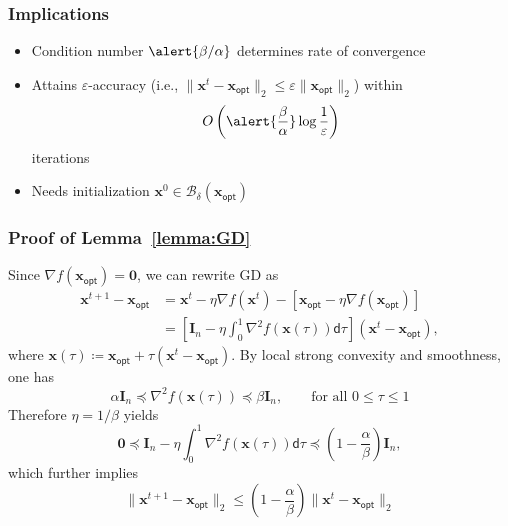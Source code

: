 \documentclass[compress,
mathserif,wide,%
]{beamer}
\begin{document}
\begin{frame}
	\frametitle{Implications}
		\begin{itemize}
	\itemsep0.5em
	\item Condition number $\alert{\beta / \alpha}$ determines rate of convergence
	\item Attains $\varepsilon$-accuracy (i.e., $\|\bm{x}^{t} -\bm{x}_{\mathsf{opt}}\|_2 \leq \varepsilon \|\bm{x}_{\mathsf{opt}}\|_2$) within 
	\[
	O\left( \alert{ \frac{\beta}{\alpha} } \log\frac{1}{\varepsilon} \right)
	\]
	 iterations
	 \item Needs initialization $\bm{x}^{0} \in \mathcal{B}_{\delta}(\bm{x}_{\mathsf{opt}})$
\end{itemize}
\end{frame}

\begin{frame}
	\frametitle{Proof of Lemma~\ref{lemma:GD}}
	Since $\nabla f(\bm{x}_{\mathsf{opt}}) = \bm{0}$, we can rewrite GD as
	\begin{align*}
		\bm{x}^{t+1} - \bm{x}_{\mathsf{opt}} &= \bm{x}^t - \eta \nabla f(\bm{x}^t) - [\bm{x}_{\mathsf{opt}} - \eta \nabla f(\bm{x}_{\mathsf{opt}})] \\
		&= \left[ \bm{I}_{n} - \eta \int_{0}^{1} \nabla^2 f (\bm{x}(\tau)) \mathsf{d}\tau \right ] (\bm{x}^t - \bm{x}_{\mathsf{opt}}),
	\end{align*}
	where $\bm{x}(\tau) \coloneqq \bm{x}_{\mathsf{opt}} + \tau (\bm{x}^t - \bm{x}_{\mathsf{opt}})$. By local strong convexity and smoothness, one has
	\[
	\alpha \bm{I}_{n} \preceq \nabla^2 f (\bm{x}(\tau)) \preceq \beta \bm{I}_{n}, \qquad \text{for all } 0 \leq \tau \leq 1
	\]
	Therefore $\eta = 1 / \beta$ yields
	\[
	\bm{0} \preceq \bm{I}_{n} - \eta \int_{0}^{1} \nabla^2 f (\bm{x}(\tau)) \mathsf{d}\tau \preceq (1 - \frac{\alpha}{\beta}) \bm{I}_{n},
	\]
	which further implies 
	\[
	\|\bm{x}^{t+1} -\bm{x}_{\mathsf{opt}}\|_2 \leq \left(1- {\frac{\alpha}{\beta}}  
\right)\|\bm{x}^{t} -\bm{x}_{\mathsf{opt}}\|_2
	\]
\end{frame}
\end{document}
